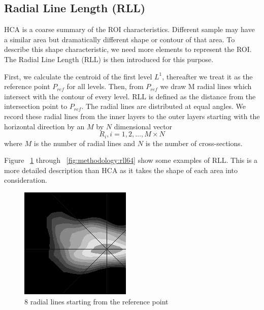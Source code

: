\subsection{Radial Line Length (RLL)}
\label{ssec:methodology:rll}

HCA is a coarse summary of the ROI characteristics. Different sample may have a similar area but dramatically different shape or contour of that area. To describe this shape characteristic, we need more elements to represent the ROI. The Radial Line Length (RLL) is then introduced for this purpose.

First, we calculate the centroid of the first level  $L^1$, thereafter we treat it as the reference point $P_{ref}$ for all levels. Then, from $P_{ref}$ we draw M radial lines which intersect with the contour of every level. RLL is defined as the distance from the intersection point to $P_{ref}$. The radial lines are distributed at equal angles. We record these radial lines from the inner layers to the outer layers starting with the horizontal direction by an $M$ by $N$ dimensional vector
\begin{equation}
R_i, i=1,2,\dots,M\times N
\end{equation}
where $M$ is the number of radial lines and $N$ is the number of cross-sections.

Figure ~\ref{fig:methodology:rll8} through ~\ref{fig:methodology:rll64} show some examples of RLL. This is a more detailed description than HCA as it takes the shape of each area into consideration.

\begin{figure}[htb]
  \begin{center}
    \includegraphics[width=0.4\linewidth]{ch-methodology/figures/rll8}
    \caption[8 radial lines starting from the reference point]{8 radial lines starting from the reference point}
    \label{fig:methodology:rll8}
  \end{center}
\end{figure}

